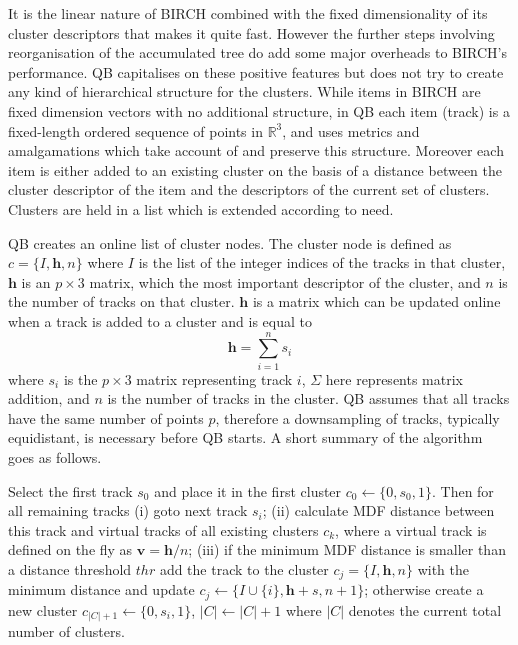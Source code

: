 \documentclass[preprint,authoryear,a4paper,10pt,onecolumn]{elsarticle}
\begin{document}
It is the linear nature of BIRCH combined with the fixed dimensionality
of its cluster descriptors that makes it quite fast. However the further
steps involving reorganisation of the accumulated tree do add some major
overheads to BIRCH's performance. QB capitalises on these positive
features but does not try to create any kind of hierarchical structure
for the clusters. While items in BIRCH are fixed dimension vectors with
no additional structure, in QB each item (track) is a fixed-length
ordered sequence of points in $\mathbb{R}^{3}$, and uses metrics and
amalgamations which take account of and preserve this structure.
Moreover each item is either added to an existing cluster on the basis
of a distance between the cluster descriptor of the item and the
descriptors of the current set of clusters. Clusters are held in a list
which is extended according to need.

QB creates an online list of cluster nodes. The cluster node is defined
as $c=\{I,\mathbf{h},n\}$ where $I$ is the list of the integer indices
of the tracks in that cluster, $\mathbf{h}$ is an $p\times3$ matrix,
which the most important descriptor of the cluster, and $n$ is the
number of tracks on that cluster. $\mathbf{h}$ is a matrix which
can be updated online when a track is added to a cluster and is equal
to\begin{equation}
\mathbf{h}=\sum_{i=1}^{n}s_{i}\end{equation}
where $s_{i}$ is the $p\times3$ matrix representing track $i$,
$\Sigma$ here represents matrix addition, and $n$ is the number
of tracks in the cluster. QB assumes that all tracks have the same
number of points $p$, therefore a downsampling of tracks, typically
equidistant, is necessary before QB starts. A short summary of the
algorithm goes as follows. 

Select the first track $s_{0}$ and place it in the first cluster
$c_{0}\leftarrow\{0,s_{0},1\}$. Then for all remaining tracks (i)
goto next track $s_{i}$; (ii) calculate MDF distance between this
track and virtual tracks of all existing clusters $c_{k}$, where
a virtual track is defined on the fly as $\mathbf{v}=\mathbf{h}/n$;
(iii) if the minimum MDF distance is smaller than a distance threshold
$\mathrm{\mathit{thr}}$ add the track to the cluster $c_{j}=\{I,\mathbf{h},n\}$
with the minimum distance and update $c_{j}\leftarrow\{I\cup\{i\},\mathbf{h}+s,n+1\}$;
otherwise create a new cluster $c_{|C|+1}\leftarrow\{0,s_{i},1\}$,
$|C|\leftarrow|C|+1$ where $|C|$ denotes the current total number
of clusters. 
\end{document}
